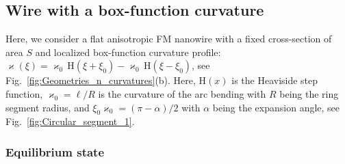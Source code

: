 \subsection{Wire with a box-function curvature} \label{sec:box_curvature}


Here, we consider a flat anisotropic FM nanowire with a fixed cross-section of area $S$ and localized box-function curvature profile: $\varkappa (\xi) = \varkappa_0 \, \mathrm{H}(\xi+\xi_0) - \varkappa_0 \, \mathrm{H}(\xi-\xi_0)$, see Fig.~\ref{fig:Geometries_n_curvatures}(b).  Here, $\mathrm{H}(x)$ is the Heaviside step function, $\varkappa_0=\ell/R$ is the curvature of the arc bending with $R$ being the ring segment radius, and $\xi_0\varkappa_0 = (\pi-\alpha)/2$ with $\alpha$ being the expansion angle, see Fig.~\ref{fig:Circular_segment_1}.

\subsubsection{Equilibrium state} \label{sec:box_curvature_equilibrium}


